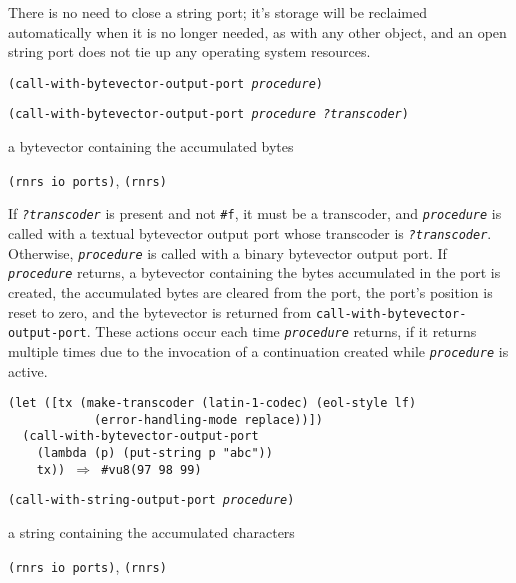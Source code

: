 There is no need to close a string port; it's storage will be reclaimed
automatically when it is no longer needed, as with any other object, and
an open string port does not tie up any operating system resources.


\begin{description}

\label{io_s38}\item[procedure] \texttt{(call-with-bytevector-output-port \textit{procedure})}



\item[procedure] \texttt{(call-with-bytevector-output-port \textit{procedure} \textit{?transcoder})}



\item[returns] a bytevector containing the accumulated bytes


\item[libraries] \texttt{(rnrs io ports)}, \texttt{(rnrs)}
\end{description}


If \texttt{\textit{?transcoder}} is present and not \texttt{\#{}f}, it must be a
transcoder, and \texttt{\textit{procedure}} is called with a textual bytevector output port
whose transcoder is \texttt{\textit{?transcoder}}.
Otherwise, \texttt{\textit{procedure}} is called with a binary bytevector output port.
If \texttt{\textit{procedure}} returns, a bytevector containing the bytes accumulated in the port
is created, the accumulated bytes are cleared from the port, the port's position is
reset to zero, and the bytevector is returned from \texttt{call-with-bytevector-output-port}.
These actions occur each time \texttt{\textit{procedure}} returns, if it returns
multiple times due to the invocation of a continuation created while
\texttt{\textit{procedure}} is active.


\begin{alltt}
(let ([tx (make-transcoder (latin-1-codec) (eol-style lf)
            (error-handling-mode replace))])
  (call-with-bytevector-output-port
    (lambda (p) (put-string p "abc"))
    tx)) \(\Rightarrow\) \#{}vu8(97 98 99)
\end{alltt}

\begin{description}

\label{io_s39}\item[procedure] \texttt{(call-with-string-output-port \textit{procedure})}



\item[returns] a string containing the accumulated characters


\item[libraries] \texttt{(rnrs io ports)}, \texttt{(rnrs)}
\end{description}

